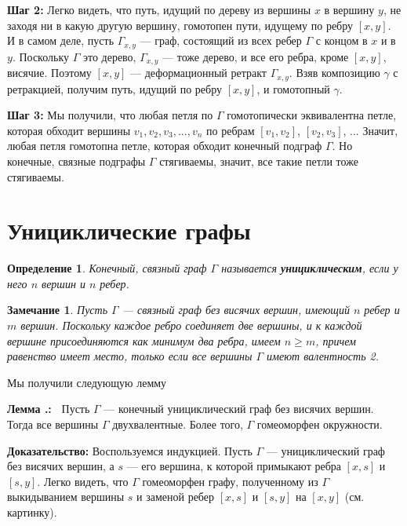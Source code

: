 \documentclass[12pt]{book}
\def\endproof{\hbox{\vrule width 5pt height 5pt depth 0pt}}
\theoremstyle{upshape}
\newtheorem{zadacha}{Задача}[chapter]
\theoremstyle{generic}
\newtheorem{opredelenie}[teorema]{Определение}
\newtheorem{remark}[teorema]{Замечание}
\def\замечание{\begin{remark}}
\def\еза{\end{remark}}
\theoremstyle{upshapenonumber}
\newcommand{\следствие}{%
     \refstepcounter{teorema}
     {\noindent\bf Следствие \thechapter.\arabic{teorema}:\ }}
\newcommand{\пример}{%
     \refstepcounter{teorema}
     {\noindent\bf Пример \thechapter.\arabic{teorema}:\ }}
\newcommand{\лемма}{%
     \refstepcounter{teorema}
     {\noindent\bf Лемма \thechapter.\arabic{teorema}:\ }}
\newcommand{\теорема}{%
     \refstepcounter{teorema}
     {\noindent\bf Теорема \thechapter.\arabic{teorema}:\ }}
\newcommand{\утверждение}{%
     \refstepcounter{teorema}
     {\noindent\bf Утверждение \thechapter.\arabic{teorema}:\ }}
\def\хфилл{\hfill}
\def\ноиндент{\noindent}
\def\бф{\bf}
\def\ем{\em}
\def\задача{\begin{zadacha}}
\def\ез{\end{zadacha}}
\def\еу{\end{ukazanie}}
\def\определение{\begin{opredelenie}}
\def\ео{\end{opredelenie}}
\def\енум{\begin{enumerate}}
\def\ее{\end{enumerate}}
\begin{document}
\хфилл

\ноиндент
{\бф Шаг 2:}
Легко видеть,
что путь, идущий по дереву из вершины $x$ в вершину
$y$, не заходя ни в какую другую вершину, гомотопен
пути, идущему по ребру $[x,y]$. И в самом деле,
пусть $\Gamma_{x,y}$ --- граф, состоящий из всех
ребер $\Gamma$ с концом в $x$ и в $y$.
Поскольку $\Gamma$ это дерево, $\Gamma_{x,y}$ --- тоже
дерево, и все его ребра, кроме $[x,y]$, висячие.
Поэтому $[x,y]$ --- деформационный ретракт
$\Gamma_{x,y}$. Взяв композицию $\gamma$ с ретракцией,
получим путь, идущий по ребру $[x,y]$, и гомотопный
$\gamma$.


\хфилл

\ноиндент
{\бф Шаг 3:} Мы получили, что любая петля по $\Gamma$
гомотопически эквивалентна петле, которая обходит
вершины $v_1, v_2, v_3, ..., v_n$ по ребрам
$[v_1, v_2]$, $[v_2, v_3]$, ...
Значит, любая петля гомотопна петле, которая 
обходит конечный подграф $\Gamma$. Но конечные,
связные подграфы $\Gamma$ стягиваемы, значит,
все такие петли тоже стягиваемы.
\endproof

\section{Унициклические графы}


\определение
Конечный, связный граф $\Gamma$ называется
{\бф унициклическим}, если у него $n$ вершин
и $n$ ребер. 
\ео

\замечание
Пусть $\Gamma$ --- связный граф без висячих вершин,
имеющий $n$ ребер и $m$ вершин.
Поскольку каждое ребро соединяет две вершины,
и к каждой вершине присоединяются как минимум
два ребра, имеем $n \geq m$, причем равенство
имеет место, только если все вершины $\Gamma$
имеют валентность 2.
\еза

Мы получили следующую лемму


\хфилл

\лемма
Пусть $\Gamma$ --- конечный унициклический
граф без висячих вершин. Тогда все вершины $\Gamma$
двухвалентные. Более того, $\Gamma$ гомеоморфен окружности.


\хфилл

\ноиндент
{\бф Доказательство:} Воспользуемся индукцией.
Пусть $\Gamma$ --- унициклический граф без 
висячих вершин, а $s$ --- его вершина,
к которой примыкают ребра $[x,s]$ и $[s,y]$.
Легко видеть, что $\Gamma$ гомеоморфен графу,
полученному из $\Gamma$ выкидыванием вершины $s$
и заменой ребер $[x,s]$ и $[s,y]$ на $[x,y]$
(см. картинку).
\end{document}
